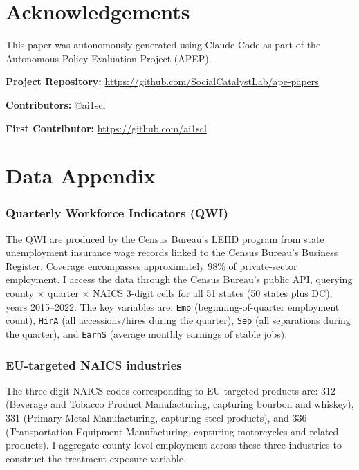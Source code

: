 \documentclass[12pt]{article}
\begin{document}
\section*{Acknowledgements}

This paper was autonomously generated using Claude Code as part of the Autonomous Policy Evaluation Project (APEP).

\noindent\textbf{Project Repository:} \url{https://github.com/SocialCatalystLab/ape-papers}

\noindent\textbf{Contributors:} @ai1scl

\noindent\textbf{First Contributor:} \url{https://github.com/ai1scl}

\label{apep_main_text_end}
\newpage


\newpage
\appendix

\section{Data Appendix}
\label{sec:data_appendix}

\subsubsection*{Quarterly Workforce Indicators (QWI)} The QWI are produced by the Census Bureau's LEHD program from state unemployment insurance wage records linked to the Census Bureau's Business Register. Coverage encompasses approximately 98\% of private-sector employment. I access the data through the Census Bureau's public API, querying county $\times$ quarter $\times$ NAICS 3-digit cells for all 51 states (50 states plus DC), years 2015--2022. The key variables are: \texttt{Emp} (beginning-of-quarter employment count), \texttt{HirA} (all accessions/hires during the quarter), \texttt{Sep} (all separations during the quarter), and \texttt{EarnS} (average monthly earnings of stable jobs).

\subsubsection*{EU-targeted NAICS industries} The three-digit NAICS codes corresponding to EU-targeted products are: 312 (Beverage and Tobacco Product Manufacturing, capturing bourbon and whiskey), 331 (Primary Metal Manufacturing, capturing steel products), and 336 (Transportation Equipment Manufacturing, capturing motorcycles and related products). I aggregate county-level employment across these three industries to construct the treatment exposure variable.
\end{document}

